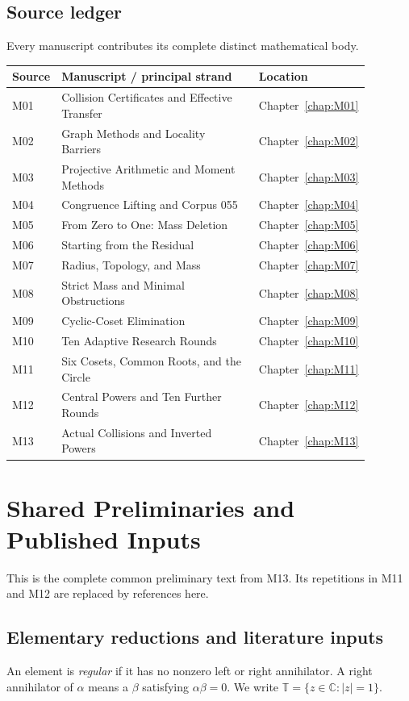 \documentclass[11pt,a4paper,oneside]{report}
\theoremstyle{definition}
\theoremstyle{remark}
\newcommand{\C}{\mathbb C}
\newcommand{\T}{\mathbb T}
\begin{document}
\section{Source ledger}
Every manuscript contributes its complete distinct mathematical body.
\begin{longtable}{P{0.08\linewidth}P{0.66\linewidth}P{0.14\linewidth}}
\toprule Source & Manuscript / principal strand & Location\\
\midrule\endhead
M01 & Collision Certificates and Effective Transfer & Chapter~\ref{chap:M01}\\
M02 & Graph Methods and Locality Barriers & Chapter~\ref{chap:M02}\\
M03 & Projective Arithmetic and Moment Methods & Chapter~\ref{chap:M03}\\
M04 & Congruence Lifting and Corpus 055 & Chapter~\ref{chap:M04}\\
M05 & From Zero to One: Mass Deletion & Chapter~\ref{chap:M05}\\
M06 & Starting from the Residual & Chapter~\ref{chap:M06}\\
M07 & Radius, Topology, and Mass & Chapter~\ref{chap:M07}\\
M08 & Strict Mass and Minimal Obstructions & Chapter~\ref{chap:M08}\\
M09 & Cyclic-Coset Elimination & Chapter~\ref{chap:M09}\\
M10 & Ten Adaptive Research Rounds & Chapter~\ref{chap:M10}\\
M11 & Six Cosets, Common Roots, and the Circle & Chapter~\ref{chap:M11}\\
M12 & Central Powers and Ten Further Rounds & Chapter~\ref{chap:M12}\\
M13 & Actual Collisions and Inverted Powers & Chapter~\ref{chap:M13}\\
\bottomrule\end{longtable}
\chapter{Shared Preliminaries and Published Inputs}\label{chap:common}
This is the complete common preliminary text from M13. Its
repetitions in M11 and M12 are replaced by references here.
\section{Elementary reductions and literature inputs}

An element is \emph{regular} if it has no nonzero left or right
annihilator. A right annihilator of $\alpha$ means a $\beta$ satisfying
$\alpha\beta=0$. We write $\T=\{z\in\C:|z|=1\}$.
\end{document}
